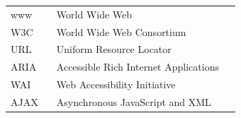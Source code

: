\documentclass[a4paper,bibtotoc,oneside]{scrbook}
\begin{document}
\hspace{-17mm}\begin{tabular}{>{\raggedleft}p{0.2\linewidth} p{0.75\linewidth} p{0.1\linewidth}}

www & World Wide Web\\
W3C & World Wide Web Consortium\\
URL & Uniform Resource Locator\\
ARIA & Accessible Rich Internet Applications\\
WAI & Web Accessibility Initiative\\
AJAX & Asynchronous JavaScript and XML\\
\end{tabular}


\end{document}
